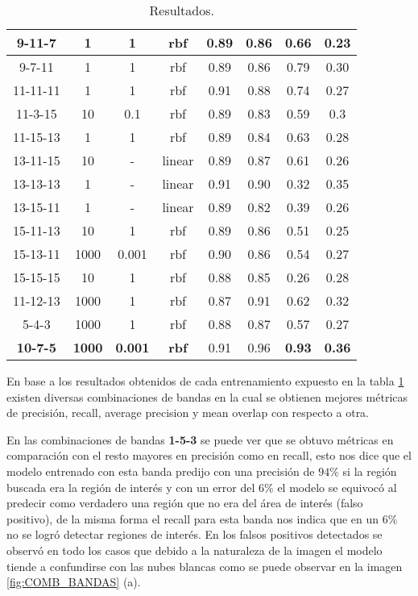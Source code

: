 \begin{table}[H]
\begin{center}
\begin{tabular}{|c|c|c|c|c|c|c|c|}
\multicolumn{1}{|c|}{9-11-7} & 1 & 1 & rbf & 0.89 & 0.86 & 0.66 & 0.23 \\ \hline
\multicolumn{1}{|c|}{9-7-11} & 1 & 1 & rbf & 0.89 & 0.86 & 0.79 & 0.30\\ \hline
\multicolumn{1}{|c|}{11-11-11} & 1 & 1 & rbf & 0.91 & 0.88 & 0.74 & 0.27 \\ \hline
\multicolumn{1}{|c|}{11-3-15} & 10 & 0.1 & rbf & 0.89 & 0.83 & 0.59 & 0.3 \\ \hline
\multicolumn{1}{|c|}{11-15-13} & 1 & 1 & rbf & 0.89 & 0.84 & 0.63 & 0.28 \\ \hline
\multicolumn{1}{|c|}{13-11-15} & 10 & - & linear & 0.89 & 0.87 & 0.61 & 0.26 \\ \hline
\multicolumn{1}{|c|}{13-13-13} & 1 & - & linear & 0.91 & 0.90 & 0.32 & 0.35 \\ \hline
\multicolumn{1}{|c|}{13-15-11} & 1 & - & linear & 0.89 & 0.82 & 0.39 & 0.26 \\ \hline
\multicolumn{1}{|c|}{15-11-13} & 10 & 1 & rbf & 0.89 & 0.86 & 0.51 & 0.25 \\ \hline
\multicolumn{1}{|c|}{15-13-11} & 1000 & 0.001 & rbf & 0.90 & 0.86 & 0.54 & 0.27 \\ \hline
\multicolumn{1}{|c|}{15-15-15} & 10 & 1 & rbf & 0.88 & 0.85 & 0.26 & 0.28 \\ \hline
\multicolumn{1}{|c|}{11-12-13} & 1000 & 1 & rbf & 0.87 & 0.91 & 0.62 & 0.32 \\ \hline
\multicolumn{1}{|c|}{5-4-3} & 1000 & 1 & rbf & 0.88 & 0.87 & 0.57 & 0.27 \\ \hline
\multicolumn{1}{|c|}{\textbf{10-7-5}} & \textbf{1000} &\textbf{ 0.001} & \textbf{rbf} & 0.91 & 0.96 &\cellcolor{blue!25}\textbf{0.93} & \cellcolor{blue!25}\textbf{0.36}\\ \hline
\end{tabular}
\end{center}\caption{Resultados.}\label{tab:entrenam-result}
\end{table}

En base a los resultados obtenidos de cada entrenamiento expuesto en la tabla \ref{tab:entrenam-result} existen diversas combinaciones de bandas en la cual se obtienen mejores métricas de precisión, recall, average precision y mean overlap con respecto a otra.  

En las combinaciones de bandas \textbf{1-5-3} se puede ver que se obtuvo métricas en comparación con el resto mayores en precisión como en recall, esto nos dice que el modelo entrenado con esta banda predijo con una precisión de  $94\%$  si la región buscada era la región de interés y con un error del $6\%$ el modelo se equivocó al predecir como verdadero una región que no era del área de interés (falso positivo), de la misma forma el recall para esta banda nos indica que en un $6\%$ no se logró detectar regiones de interés. En los falsos positivos detectados se observó en todo los casos que debido a la naturaleza de la imagen el modelo tiende a confundirse con las nubes blancas como se puede observar en la imagen \ref{fig:COMB_BANDAS} (a).

